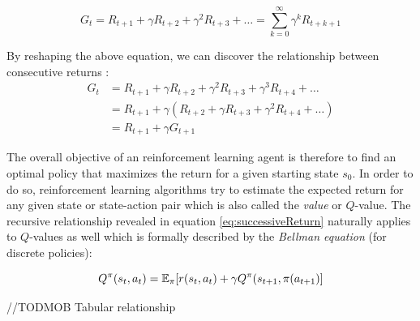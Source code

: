 \begin{equation}\label{eq:discountedReturn}
    G_t = R_{t+1} + \gamma R_{t+2} + \gamma^2 R_{t+3} + \dots  = \sum_{k=0}^\infty{\gamma^k R_{t+k+1}}
\end{equation}

By reshaping the above equation, we can discover the relationship between consecutive returns \cite[p.55]{Sutton1998}:
\begin{equation}\label{eq:successiveReturn}
    \begin{aligned}
    G_t &= R_{t+1} + \gamma R_{t+2} + \gamma^2 R_{t+3} + \gamma^3 R_{t+4} + \dots \\
    &= R_{t+1} + \gamma (R_{t+2} + \gamma R_{t+3} + \gamma^2 R_{t+4} + \dots)  \\
   & = R_{t+1} + \gamma G_{t+1}
    \end{aligned}
\end{equation}

The overall objective of an reinforcement learning agent is therefore to find an optimal policy that maximizes the return for a given starting state $s_0$. In order to do so, reinforcement learning algorithms try to estimate the expected return for any given state or state-action pair which is also called the \textit{value} or $Q$-value. The recursive relationship revealed in equation \ref{eq:successiveReturn} naturally applies to $Q$-values as well which is formally described by the \textit{Bellman equation} (for discrete policies):

\begin{equation}
    Q^\pi(s_t, a_t) = \operatorname{\mathbb{E}}_\pi[r(s_t, a_t) + \gamma Q^\pi(s_{t+1}, \pi(a_{t+1})]
\end{equation}


//TODMOB Tabular relationship